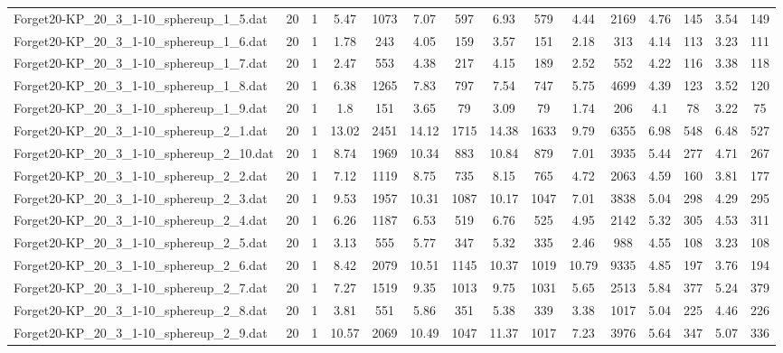 \begin{table}[!ht]
{\begin{tabular}{lcccccccccccccc}
Forget20-KP\_20\_3\_1-10\_sphereup\_1\_5.dat & 20 & 1 & 5.47 & 1073 & 7.07 & 597 & 6.93 & 579 & 4.44 & 2169 & 4.76 & 145 & 3.54 & 149 \\
Forget20-KP\_20\_3\_1-10\_sphereup\_1\_6.dat & 20 & 1 & 1.78 & 243 & 4.05 & 159 & 3.57 & 151 & 2.18 & 313 & 4.14 & 113 & 3.23 & 111 \\
Forget20-KP\_20\_3\_1-10\_sphereup\_1\_7.dat & 20 & 1 & 2.47 & 553 & 4.38 & 217 & 4.15 & 189 & 2.52 & 552 & 4.22 & 116 & 3.38 & 118 \\
Forget20-KP\_20\_3\_1-10\_sphereup\_1\_8.dat & 20 & 1 & 6.38 & 1265 & 7.83 & 797 & 7.54 & 747 & 5.75 & 4699 & 4.39 & 123 & 3.52 & 120 \\
Forget20-KP\_20\_3\_1-10\_sphereup\_1\_9.dat & 20 & 1 & 1.8 & 151 & 3.65 & 79 & 3.09 & 79 & 1.74 & 206 & 4.1 & 78 & 3.22 & 75 \\
Forget20-KP\_20\_3\_1-10\_sphereup\_2\_1.dat & 20 & 1 & 13.02 & 2451 & 14.12 & 1715 & 14.38 & 1633 & 9.79 & 6355 & 6.98 & 548 & 6.48 & 527 \\
Forget20-KP\_20\_3\_1-10\_sphereup\_2\_10.dat & 20 & 1 & 8.74 & 1969 & 10.34 & 883 & 10.84 & 879 & 7.01 & 3935 & 5.44 & 277 & 4.71 & 267 \\
Forget20-KP\_20\_3\_1-10\_sphereup\_2\_2.dat & 20 & 1 & 7.12 & 1119 & 8.75 & 735 & 8.15 & 765 & 4.72 & 2063 & 4.59 & 160 & 3.81 & 177 \\
Forget20-KP\_20\_3\_1-10\_sphereup\_2\_3.dat & 20 & 1 & 9.53 & 1957 & 10.31 & 1087 & 10.17 & 1047 & 7.01 & 3838 & 5.04 & 298 & 4.29 & 295 \\
Forget20-KP\_20\_3\_1-10\_sphereup\_2\_4.dat & 20 & 1 & 6.26 & 1187 & 6.53 & 519 & 6.76 & 525 & 4.95 & 2142 & 5.32 & 305 & 4.53 & 311 \\
Forget20-KP\_20\_3\_1-10\_sphereup\_2\_5.dat & 20 & 1 & 3.13 & 555 & 5.77 & 347 & 5.32 & 335 & 2.46 & 988 & 4.55 & 108 & 3.23 & 108 \\
Forget20-KP\_20\_3\_1-10\_sphereup\_2\_6.dat & 20 & 1 & 8.42 & 2079 & 10.51 & 1145 & 10.37 & 1019 & 10.79 & 9335 & 4.85 & 197 & 3.76 & 194 \\
Forget20-KP\_20\_3\_1-10\_sphereup\_2\_7.dat & 20 & 1 & 7.27 & 1519 & 9.35 & 1013 & 9.75 & 1031 & 5.65 & 2513 & 5.84 & 377 & 5.24 & 379 \\
Forget20-KP\_20\_3\_1-10\_sphereup\_2\_8.dat & 20 & 1 & 3.81 & 551 & 5.86 & 351 & 5.38 & 339 & 3.38 & 1017 & 5.04 & 225 & 4.46 & 226 \\
Forget20-KP\_20\_3\_1-10\_sphereup\_2\_9.dat & 20 & 1 & 10.57 & 2069 & 10.49 & 1047 & 11.37 & 1017 & 7.23 & 3976 & 5.64 & 347 & 5.07 & 336 \\

\end{tabular}}
\end{table}
